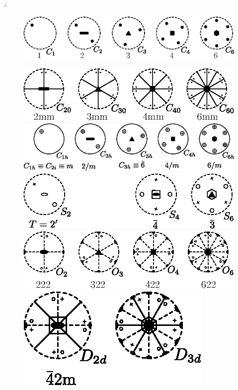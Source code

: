 $\therefore \ $ 
\begin{figure}[H]
\centering
\includegraphics{images/lecture10/fig6.eps}
\end{figure}
\begin{figure}[H]
\centering
\includegraphics{images/lecture10/fig7.eps}

\bigskip

\includegraphics{images/lecture10/fig8.eps}

\bigskip

\includegraphics{images/lecture10/fig9.eps}

\bigskip

\includegraphics{images/lecture10/fig10.eps}

\bigskip

\includegraphics{images/lecture10/fig11.eps}


\end{figure}
